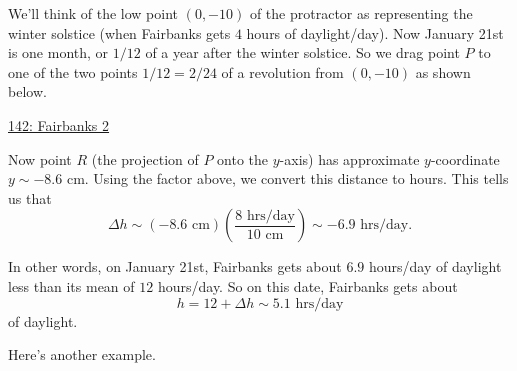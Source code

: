 \documentclass{ximera}
\begin{document}
\begin{example}
\begin{explanation}
\begin{enumerate}
We'll think of the low point $(0,-10)$ of the protractor as representing the winter solstice (when Fairbanks gets $4$ hours of daylight/day). Now January 21st is one month, or $1/12$ of a year after the winter solstice. So we drag point $P$ to one of the two points $1/12 = 2/24$ of a revolution from $(0,-10)$ as shown below.


\begin{onlineOnly}
    \begin{center}
\end{center}
\end{onlineOnly}

\href{https://www.desmos.com/calculator/4xsc9i7i4s}{142: Fairbanks 2}

Now point $R$ (the projection of $P$ onto the $y$-axis) has approximate $y$-coordinate $y\sim-8.6$ cm. Using the factor above, we convert this distance to hours. This tells us that
\[
  \Delta h \sim (-8.6 \text{ cm})\left( \frac{8 \text{ hrs/day}}{10 \text{ cm}} \right) \sim -6.9\text{ hrs/day}.
\] 

In other words, on January 21st, Fairbanks gets about $6.9$ hours/day of daylight less than its mean of $12$ hours/day. So on this date, Fairbanks gets about
\[
   h = 12  + \Delta h \sim 5.1 \text{ hrs/day} 
\]
of daylight.


\end{enumerate}
\end{explanation}

\end{example}


Here's another example.
\end{document}
